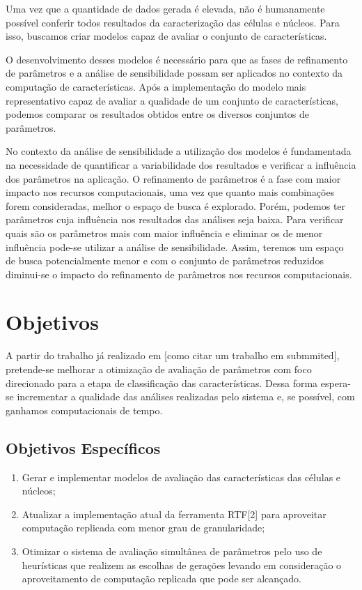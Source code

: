 \documentclass[a4paper,10pt]{article}
\begin{document}
Uma vez que a quantidade de dados gerada é elevada, não é humanamente possível conferir todos resultados da caracterização das células e núcleos. Para isso, buscamos criar modelos capaz de avaliar o conjunto de características.

O desenvolvimento desses modelos é necessário para que as fases de refinamento de parâmetros e a análise de sensibilidade possam ser aplicados no contexto da computação de características. Após a implementação do modelo mais representativo capaz de avaliar a qualidade de um conjunto de características, podemos comparar os resultados obtidos entre os diversos conjuntos de parâmetros. 

No contexto da análise de sensibilidade a utilização dos modelos é fundamentada na necessidade de quantificar a variabilidade dos resultados e verificar a influência dos parâmetros na aplicação. O refinamento de parâmetros é a fase com maior impacto nos recursos computacionais, uma vez que quanto mais combinações forem consideradas, melhor o espaço de busca é explorado. Porém, podemos ter parâmetros cuja influência nos resultados das análises seja baixa. Para verificar quais são os parâmetros mais com maior influência e eliminar os de menor influência pode-se utilizar a análise de sensibilidade. Assim, teremos um espaço de busca potencialmente menor e com o conjunto de parâmetros reduzidos diminui-se o impacto do refinamento de parâmetros nos recursos computacionais.

\section{Objetivos}

A partir do trabalho já realizado em [como citar um trabalho em submmited], pretende-se melhorar a otimização de avaliação de parâmetros com foco direcionado para a etapa de classificação das características. Dessa forma espera-se incrementar a qualidade das análises realizadas pelo sistema e, se possível, com ganhamos computacionais de tempo.


\subsection{Objetivos Específicos}

\begin{enumerate}
	\item  Gerar e implementar modelos de avaliação das características das células e núcleos;
\item Atualizar a implementação atual da ferramenta RTF[2] para aproveitar computação replicada com menor grau de granularidade;
\item Otimizar o sistema de avaliação simultânea de parâmetros pelo uso de heurísticas que realizem as escolhas de gerações levando em consideração o aproveitamento de computação replicada que pode ser alcançado.
\end{enumerate}
\end{document}
